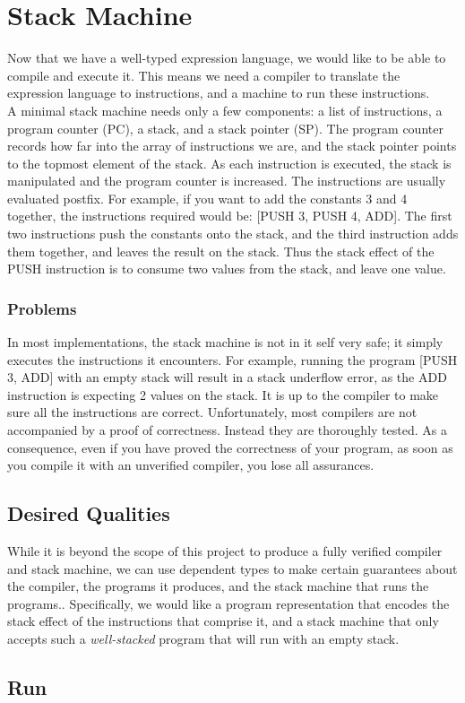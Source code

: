 \section{Stack Machine}
\label{sec:stack-machine}


Now that we have a well-typed expression language, we would like to be able to compile and execute it. This means we need a compiler to translate the expression language to instructions, and a  machine to run these instructions.
\\
A minimal stack machine needs only a few components: a list of instructions, a program counter (PC), a stack, and a stack pointer (SP). The program counter records how far into the array of instructions we are, and the stack pointer points to the topmost element of the stack. As each instruction is executed, the stack is manipulated and the program counter is increased. The instructions are usually evaluated postfix. For example, if you want to add the constants 3 and 4 together, the instructions required would be: [PUSH 3, PUSH 4, ADD]. The first two instructions push the constants onto the stack, and the third instruction adds them together, and leaves the result on the stack. Thus the stack effect of the PUSH instruction is to consume two values from the stack, and leave one value.

\subsubsection{Problems}
In most implementations, the stack machine is not in it self very safe; it simply executes the instructions it encounters. For example, running the program [PUSH 3, ADD] with an empty stack will result in a stack underflow error, as the ADD instruction is expecting 2 values on the stack. It is up to the compiler to make sure all the instructions are correct. Unfortunately, most compilers are not accompanied by a proof of correctness. Instead they are thoroughly tested. As a consequence, even if you have proved the correctness of your program, as soon as you compile it with an unverified compiler, you lose all assurances. \cite{Leroy_formalverification}

\subsection{Desired Qualities}
While it is beyond the scope of this project to produce a fully verified compiler and stack machine, we can use dependent types to make certain guarantees about the compiler, the programs it produces, and the stack machine that runs the programs.. Specifically, we would like a program representation that encodes the stack effect of the instructions that comprise it, and a stack machine that only accepts such a \textit{well-stacked} program that will run with an empty stack.



\subsection{Run}
\label{sec:running_a_program}
